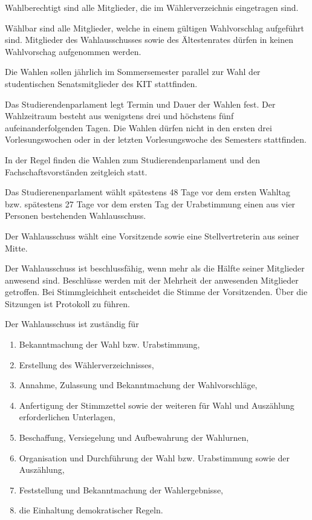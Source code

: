 \begin{jurdoc}
Wahlberechtigt sind alle Mitglieder, die im Wählerverzeichnis eingetragen sind.

Wählbar sind alle Mitglieder, welche in einem gültigen Wahlvorschlag aufgeführt sind. Mitglieder des Wahlausschusses sowie des Ältestenrates dürfen in keinen Wahlvorschag aufgenommen werden.

\label{wahl:walhtermin}
Die Wahlen sollen jährlich im Sommersemester parallel zur Wahl der studentischen Senatsmitglieder des KIT stattfinden. 

Das Studierendenparlament legt Termin und Dauer der Wahlen fest. Der Wahlzeitraum besteht aus wenigstens drei und höchstens fünf aufeinanderfolgenden Tagen. Die Wahlen dürfen nicht in den ersten drei Vorlesungswochen oder in der letzten Vorlesungswoche des Semesters stattfinden. 

In der Regel finden die Wahlen zum Studierendenparlament und den Fachschaftsvorständen zeitgleich statt.

\label{wahl:wahlausschuss}
Das Studierenenparlament wählt spätestens 48 Tage vor dem ersten Wahltag bzw. spätestens 27 Tage vor dem ersten Tag der Urabstimmung einen aus vier Personen bestehenden Wahlausschuss. 

Der Wahlausschuss wählt eine Vorsitzende sowie eine Stellvertreterin aus seiner Mitte.

Der Wahlausschuss ist beschlussfähig, wenn mehr als die Hälfte seiner Mitglieder anwesend sind. Beschlüsse werden mit der Mehrheit der anwesenden Mitglieder getroffen. Bei Stimmgleichheit entscheidet die Stimme der Vorsitzenden. Über die Sitzungen ist Protokoll zu führen.

Der Wahlausschuss ist zuständig für
\begin{enumerate}
    \item Bekanntmachung der Wahl bzw. Urabstimmung,
    \item Erstellung des Wählerverzeichnisses,
    \item Annahme, Zulassung und Bekanntmachung der Wahlvorschläge,
    \item Anfertigung der Stimmzettel sowie der weiteren für Wahl und Auszählung erforderlichen Unterlagen,
    \item Beschaffung, Versiegelung und Aufbewahrung der Wahlurnen,
    \item Organisation und Durchführung der Wahl bzw. Urabstimmung sowie der Auszählung,
    \item Feststellung und Bekanntmachung der Wahlergebnisse,
    \item die Einhaltung demokratischer Regeln.
\end{enumerate}


\end{jurdoc}
